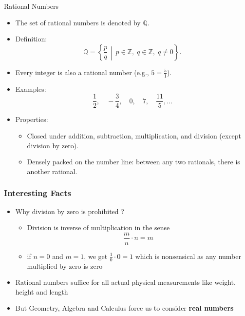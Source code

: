 \documentclass{beamer}
\begin{document}
\begin{frame}{Rational Numbers}
    \begin{itemize}
        \item The set of rational numbers is denoted by \(\mathbb{Q}\).
        \item Definition:
        \[
          \mathbb{Q} = \left\{ \frac{p}{q} \,\middle|\,
            p \in \mathbb{Z}, \; q \in \mathbb{Z}, \; q \neq 0
          \right\}.
        \]
        \item Every integer is also a rational number (e.g., \(5 = \frac{5}{1}\)).
        \item Examples:
        \[
          \frac{1}{2}, \quad -\frac{3}{4}, \quad 0, \quad 7, \quad \frac{11}{5}, \ldots
        \]
        \item Properties:
        \begin{itemize}
            \item Closed under addition, subtraction, multiplication, and division (except division by zero).
            \item Densely packed on the number line: between any two rationals, there is another rational.
        \end{itemize}
    \end{itemize}
\end{frame}

\begin{frame}
    \frametitle{Interesting Facts}
    \begin{itemize} 
        \item Why division by zero is prohibited ?
        \begin{itemize}
            \item Division is inverse of multiplication in the sense  
            \[  
            \frac{m}{n} \cdot n = m
            \]
        \item if \( n=0 \) and \( m = 1\), we get \(\frac{1}{0} \cdot 0 = 1\) which is nonsensical as any number multiplied by zero is zero
        \end{itemize}
        \item Rational numbers suffice for all actual physical measurements like weight, height and length
        \item But Geometry, Algebra and Calculus force us to consider \textbf{real numbers}
    \end{itemize}
\end{frame}
\end{document}
